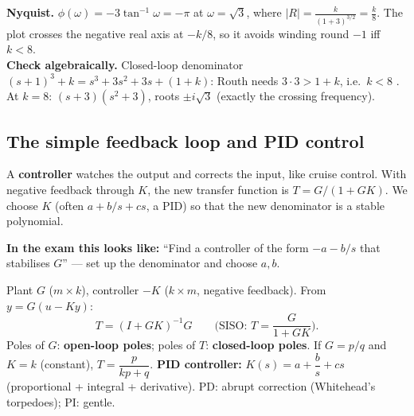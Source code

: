 \begin{workbox}[title={Worked example: $R(s)=\dfrac{k}{(s+1)^3}$, $k>0$}]
\textbf{Nyquist.} $\phi(\omega)=-3\tan^{-1}\omega=-\pi$ at $\omega=\sqrt3$, where $|R|=\frac{k}{(1+3)^{3/2}}=\frac k8$. The plot crosses the negative real axis at $-k/8$, so it avoids winding round $-1$ iff $k<8$.\\
\textbf{Check algebraically.} Closed-loop denominator $(s+1)^3+k=s^3+3s^2+3s+(1+k)$: Routh needs $3\cdot3>1+k$, i.e.\ $k<8$ \checkmark. At $k=8$: $(s+3)(s^2+3)$, roots $\pm i\sqrt3$ (exactly the crossing frequency).
\end{workbox}

\subsection{The simple feedback loop and PID control \texorpdfstring{}{}}\label{sec:pid}\label{ss:5-4}
\begin{plainbox}
A \textbf{controller} watches the output and corrects the input, like cruise control. With negative feedback through $K$, the new
transfer function is $T=G/(1+GK)$. We choose $K$ (often $a+b/s+cs$, a PID) so that the new denominator is a stable polynomial.
\par\smallskip\textbf{In the exam this looks like:} ``Find a controller of the form $-a-b/s$ that stabilises $G$'' --- set up the denominator and choose $a,b$.
\end{plainbox}
\begin{center}
\end{center}
\begin{thmbox}[title={Simple feedback loop (SFL)}]
Plant $G$ ($m\times k$), controller $-K$ ($k\times m$, negative feedback). From $y=G(u-Ky)$:
\[\boxed{T=(I+GK)^{-1}G}\qquad\text{(SISO: }T=\frac{G}{1+GK}\text{).}\]
Poles of $G$: \textbf{open-loop poles}; poles of $T$: \textbf{closed-loop poles}. If $G=p/q$ and $K=k$ (constant), $T=\dfrac{p}{kp+q}$.
\textbf{PID controller:} $K(s)=a+\dfrac bs+cs$ (proportional + integral + derivative). PD: abrupt correction (Whitehead's torpedoes); PI: gentle.
\end{thmbox}
